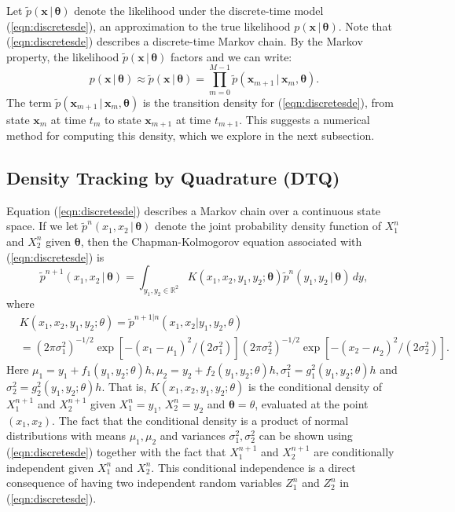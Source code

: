 \documentclass[graybox]{svmult}
\newcommand{\btheta}{\ensuremath{\boldsymbol{\theta}}}
\begin{document}
Let $\widetilde{p}(\mathbf{x} \, | \, \btheta)$ denote the likelihood under the discrete-time model (\ref{eqn:discretesde}), an approximation to the true likelihood $p(\mathbf{x} \, | \, \btheta)$.  Note that (\ref{eqn:discretesde}) describes a discrete-time Markov chain.  By the Markov property, the likelihood $\widetilde{p}(\mathbf{x} \, | \, \btheta)$ factors and we can write:
\begin{equation}
\label{eqn:markovfactor}
p(\mathbf{x} \, | \, \btheta) \approx \widetilde{p}(\mathbf{x} \, | \, \btheta) = \prod_{m=0}^{M-1} \widetilde{p}(\mathbf{x}_{m+1} \, | \, \mathbf{x}_m, \btheta).
\end{equation}
The term $\widetilde{p}(\mathbf{x}_{m+1} \, | \, \mathbf{x}_m, \btheta)$ is the transition density for (\ref{eqn:discretesde}), from state $\mathbf{x}_m$ at time $t_m$ to state $\mathbf{x}_{m+1}$ at time $t_{m+1}$.  This suggests a numerical method for computing this density, which we explore in the next subsection.
 
\subsection{Density Tracking by Quadrature (DTQ)}
\label{subsec:2-1}
Equation (\ref{eqn:discretesde}) describes a Markov chain over a continuous state space.  If we let $\widetilde{p}^n(x_1,x_2 \, | \, \btheta)$ denote the joint probability density function of $X_1^n$ and $X_2^n$ given $\btheta$, then the Chapman-Kolmogorov equation associated with (\ref{eqn:discretesde})  is
\begin{equation}
\label{eqn:chapman}
\widetilde{p}^{n+1}(x_1,x_2 \, | \, \btheta) = \int_{y_1,y_2 \in \mathbb{R}^2} K(x_1,x_2,y_1,y_2; \btheta) \widetilde{p}^n(y_1,y_2 \, | \, \btheta) \, dy,
\end{equation}
where
\begin{align}
&K(x_1,x_2,y_1,y_2; \theta) = \widetilde{p}^{{n+1} | {n}}(x_1,x_2 | y_1,y_2,\theta) \nonumber\\
&= (2 \pi \sigma_1^2)^{-1/2} \exp \left[ -(x_1 - \mu_1)^2/(2 \sigma_1^2) \right] (2 \pi \sigma_2^2)^{-1/2} \exp \left[ -(x_2 - \mu_2)^2/(2 \sigma_2^2) \right]\nonumber.
\end{align}
Here $\mu_1 = y_1 + f_1(y_1,y_2; \theta) h,  \mu_2 = y_2 + f_2(y_1,y_2; \theta) h,  \sigma_1^2 = g_1^2(y_1,y_2; \theta) h$ and  $\sigma_2^2 = g_2^2(y_1,y_2; \theta) h$. That is, $K(x_1,x_2,y_1,y_2; \theta)$ is the conditional density of $X_1^{n+1}$ and $X_2^{n+1}$ given $X_1^n = y_1$, $X_2^n = y_2$ and $\btheta = \theta$, evaluated at the point $(x_1,x_2)$.  The fact that the conditional density is a product of normal distributions with means $\mu_1, \mu_2$ and variances $\sigma_1^2, \sigma_2^2$ can be shown using (\ref{eqn:discretesde}) together with the fact that $X_1^{n+1}$ and $X_2^{n+1}$ are conditionally independent given $X_1^n$ and $X_2^n$. This conditional independence is a direct consequence of having two independent random variables $Z_1^n$ and $Z_2^n$ in (\ref{eqn:discretesde}).
\end{document}

